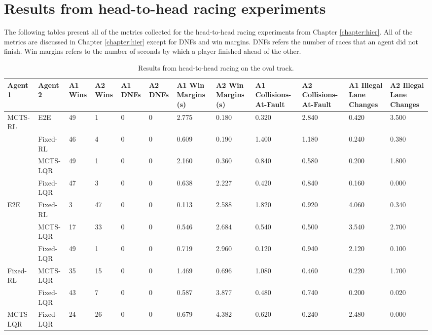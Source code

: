 \chapter{Results from head-to-head racing experiments} \label{app:hier_results}
The following tables present all of the metrics collected for the head-to-head racing experiments from Chapter \ref{chapter:hier}. All of the metrics are discussed in Chapter \ref{chapter:hier} except for DNFs and win margins. DNFs refers the number of races that an agent did not finish. Win margins refers to the number of seconds by which a player finished ahead of the other.
\begin{table}[H]
\centering
\begin{adjustbox}{width=\textwidth}
\begin{tabular}{llp{1.1cm}p{1.1cm}p{1.1cm}p{1.1cm}p{1.5cm}p{1.5cm}p{1.5cm}p{1.5cm}p{1.5cm}p{1.5cm}}
    \toprule
        Agent 1 & Agent 2 & A1 Wins & A2 Wins & A1 DNFs & A2 DNFs & A1 Win Margins (\si{\second}) & A2 Win Margins (\si{\second}) & A1 Collisions-At-Fault & A2 Collisions-At-Fault & A1 Illegal Lane Changes & A2 Illegal Lane Changes \\ \hline
        MCTS-RL & E2E & 49 & 1 & 0 & 0 & 2.775 & 0.180 & 0.320 & 2.840 & 0.420 & 3.500 \\ 
        ~ & Fixed-RL & 46 & 4 & 0 & 0 & 0.609 & 0.190 & 1.400 & 1.180 & 0.240 & 0.380 \\ 
        ~ & MCTS-LQR & 49 & 1 & 0 & 0 & 2.160 & 0.360 & 0.840 & 0.580 & 0.200 & 1.800 \\ 
        ~ & Fixed-LQR & 47 & 3 & 0 & 0 & 0.638 & 2.227 & 0.420 & 0.840 & 0.160 & 0.000 \\ 
        E2E & Fixed-RL & 3 & 47 & 0 & 0 & 0.113 & 2.588 & 1.820 & 0.920 & 4.060 & 0.340 \\ 
        ~ & MCTS-LQR & 17 & 33 & 0 & 0 & 0.546 & 2.684 & 0.540 & 0.500 & 3.540 & 2.700 \\ 
        ~ & Fixed-LQR & 49 & 1 & 0 & 0 & 0.719 & 2.960 & 0.120 & 0.940 & 2.120 & 0.100 \\ 
        Fixed-RL & MCTS-LQR & 35 & 15 & 0 & 0 & 1.469 & 0.696 & 1.080 & 0.460 & 0.220 & 1.700 \\ 
        ~ & Fixed-LQR & 43 & 7 & 0 & 0 & 0.587 & 3.877 & 0.480 & 0.740 & 0.200 & 0.020 \\ 
        MCTS-LQR & Fixed-LQR & 24 & 26 & 0 & 0 & 0.679 & 4.382 & 0.620 & 0.240 & 2.480 & 0.000 \\ \bottomrule
\end{tabular}
\end{adjustbox}
\vspace{1 mm}
\caption{Results from head-to-head racing on the oval track.}
 \label{tab:results_oval}
\end{table}
